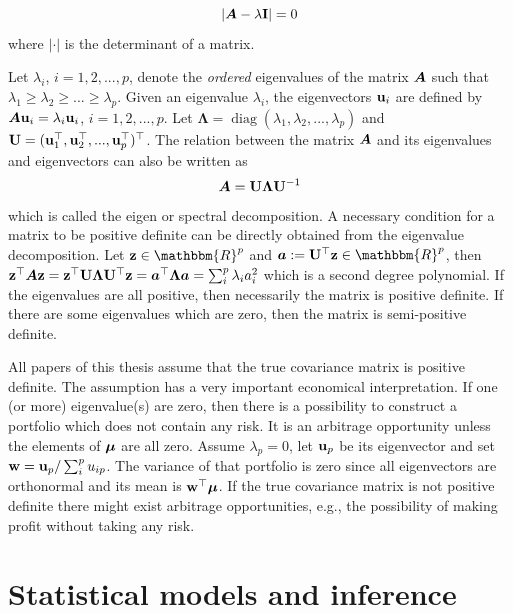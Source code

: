 \documentclass[12pt, oneside]{book}\usepackage{knitr}
\begin{document}
{\begin{definition}
	\begin{equation*}
		\left|\mbox{\boldmath$A$} - \lambda \mathbf{I}\right| = 0
	\end{equation*}
	where $|\cdot|$ is the determinant of a matrix.
\end{definition} 
Let $\lambda_i$, $i=1,2,...,p$, denote the \textit{ordered} eigenvalues of the matrix $\mbox{\boldmath$A$}$ such that $\lambda_1\geq \lambda_2 \geq ... \geq \lambda_p$.
Given an eigenvalue $\lambda_i$, the eigenvectors $\mathbf{u}_i$ are defined by $\mbox{\boldmath$A$} \mathbf{u}_i = \lambda_i \mathbf{u}_i$, $i=1,2,...,p$. 
Let $\boldsymbol{\Lambda} = \operatorname{diag}(\lambda_1, \lambda_2,...,\lambda_p)$ and $\mathbf{U}= (\mathbf{u}_1^\top, \mathbf{u}_2^\top, ..., \mathbf{u}_p^\top)^\top$. 
The relation between the matrix $\mbox{\boldmath$A$}$ and its eigenvalues and eigenvectors can also be written as 
\begin{equation}\label{eqn:eigenvalue_decomp}
	\mbox{\boldmath$A$} = \mathbf{U} \boldsymbol{\Lambda} \mathbf{U}^{-1}
\end{equation}
which is called the eigen or spectral decomposition.
A necessary condition for a matrix to be positive definite can be directly obtained from the eigenvalue decomposition. 
Let $\bz\in \mathbbm{R}^p$ and $\ba := \bU^{\top} \bz \in \mathbbm{R}^p$, then $\mathbf{z}^\top \mbox{\boldmath$A$} \mathbf{z} = \mathbf{z}^\top \mathbf{U} \boldsymbol{\Lambda} \mathbf{U} ^{\top} \mathbf{z} = \mbox{\boldmath$a$}^\top \boldsymbol{\Lambda} \mbox{\boldmath$a$} = \sum_i^p \lambda_i a_i^2$ which is a second degree polynomial. 
If the eigenvalues are all positive, then necessarily the matrix is positive definite. 
If there are some eigenvalues which are zero, then the matrix is semi-positive definite. 

All papers of this thesis assume that the true covariance matrix is positive definite. 
The assumption has a very important economical interpretation.
If one (or more) eigenvalue(s) are zero, then there is a possibility to construct a portfolio which does not contain any risk.
It is an arbitrage opportunity unless the elements of $\mbox{\boldmath$\mu$}$ are all zero.
Assume $\lambda_p=0$, let $\mathbf{u}_p$ be its eigenvector and set $\mathbf{w} = \mathbf{u}_p / \sum_i^p u_{ip}$. 
The variance of that portfolio is zero since all eigenvectors are orthonormal and its mean is $\mathbf{w}^\top \mbox{\boldmath$\mu$}$.
If the true covariance matrix is not positive definite there might exist arbitrage opportunities, e.g., the possibility of making profit without taking any risk.

\chapter{Statistical models and inference}\label{ch:estim}


}
\end{document}
